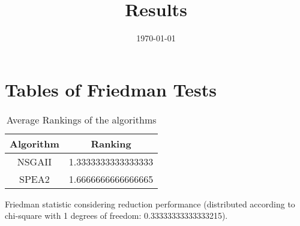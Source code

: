 \documentclass{article}
\title{Results}
\author{}
\date{\today}
\begin{document}
\oddsidemargin 0in \topmargin 0in\maketitle
\section{Tables of Friedman Tests}
\begin{table}[!htp]
\centering
\caption{Average Rankings of the algorithms
}\begin{tabular}{c|c}
Algorithm&Ranking\\
\hline
NSGAII&1.3333333333333333\\
SPEA2&1.6666666666666665\\
\end{tabular}
\end{table}


Friedman statistic considering reduction performance (distributed according to chi-square with 1 degrees of freedom: 0.33333333333333215).
\end{document}

